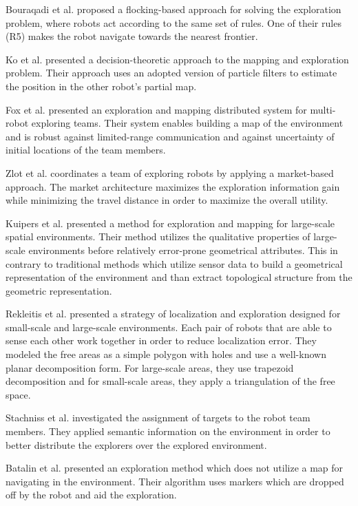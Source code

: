 Bouraqadi et al. \cite{bouraqadi_flocking-based_2009} proposed a flocking-based
approach for solving the exploration problem, where robots act according to the
same set of rules. One of their rules (R5) makes the robot navigate towards the
nearest frontier.

Ko et al. \cite{ko_practical_2003} presented a decision-theoretic approach to
the mapping and exploration problem. Their approach uses an adopted version of
particle filters to estimate the position in the other robot's partial map.

Fox et al. \cite{Fox2010ieee} presented an exploration and mapping
distributed system for multi-robot exploring teams. Their system enables
building a map of the environment and is robust against limited-range communication and
against uncertainty of initial locations of the team members.

Zlot et al. \cite{zlot2002multi} coordinates a team of exploring robots by
applying a market-based approach. The market architecture maximizes
the exploration information gain while minimizing the travel distance in order
to maximize the overall utility.

Kuipers et al. \cite{kuipers1991robot} presented a method for exploration and
mapping for large-scale spatial environments. Their method utilizes the
qualitative properties of large-scale environments before relatively error-prone
geometrical attributes. This in contrary to traditional methods which utilize
sensor data to build a geometrical representation of the environment and than
extract topological structure from the geometric representation. 

Rekleitis et al. \cite{rekleitis1997multi,rekleitis2001multi} presented a
strategy of localization and exploration designed for small-scale and large-scale
environments. Each pair of robots that are able to sense each other work together in order to reduce
localization error. They modeled the free areas as a simple polygon with holes
and use a well-known planar decomposition form. For large-scale areas, they use
trapezoid decomposition and for small-scale areas, they apply a triangulation
of the free space.

Stachniss et al. \cite{stachniss2006speeding} investigated the assignment
of targets to the robot team members. They applied semantic information on the
environment in order to better distribute the explorers over the explored
environment.

Batalin et al. \cite{batalin2003efficient} presented an exploration method which
does not utilize a map for navigating in the environment. Their algorithm uses
markers which are dropped off by the robot and aid the exploration.

